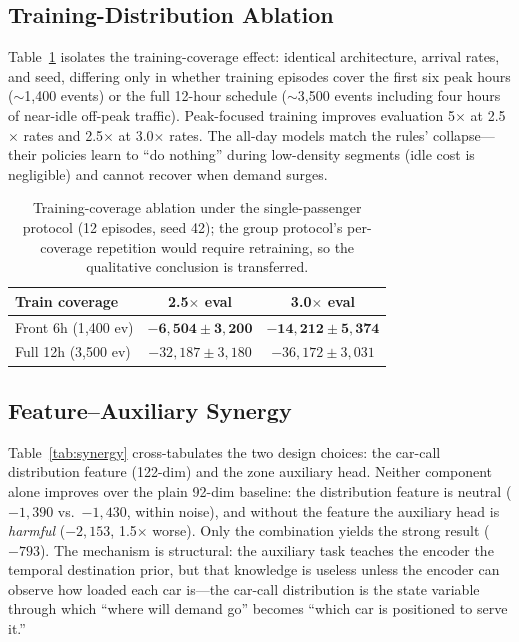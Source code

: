 \documentclass[conference]{IEEEtran}
\begin{document}
\subsection{Training-Distribution Ablation}

Table~\ref{tab:coverage} isolates the training-coverage effect:
identical architecture, arrival rates, and seed, differing only in
whether training episodes cover the first six peak hours
($\sim$1{,}400 events) or the full 12-hour schedule
($\sim$3{,}500 events including four hours of near-idle off-peak
traffic). Peak-focused training improves evaluation 5$\times$ at
2.5$\times$ rates and 2.5$\times$ at 3.0$\times$ rates. The
all-day models match the rules' collapse---their policies learn to
``do nothing'' during low-density segments (idle cost is negligible)
and cannot recover when demand surges.

\begin{table}[t]
\centering
\caption{Training-coverage ablation under the single-passenger protocol (12 episodes, seed 42); the group protocol's per-coverage repetition would require retraining, so the qualitative conclusion is transferred.}
\label{tab:coverage}
\begin{tabular}{@{}lcc@{}}
\toprule
Train coverage & 2.5$\times$ eval & 3.0$\times$ eval \\
\midrule
Front 6h (1{,}400 ev) & $\mathbf{-6{,}504 \pm 3{,}200}$ &
$\mathbf{-14{,}212 \pm 5{,}374}$ \\
Full 12h (3{,}500 ev) & $-32{,}187 \pm 3{,}180$ & $-36{,}172 \pm 3{,}031$ \\
\bottomrule
\end{tabular}
\end{table}

\subsection{Feature--Auxiliary Synergy}

Table~\ref{tab:synergy} cross-tabulates the two design choices: the
car-call distribution feature (122-dim) and the zone auxiliary head.
Neither component alone improves over the plain 92-dim baseline:
the distribution feature is neutral
($-1{,}390$ vs.~$-1{,}430$, within noise), and without the feature
the auxiliary head is \emph{harmful} ($-2{,}153$, 1.5$\times$
worse). Only the combination yields the strong result
($-793$). The mechanism is structural: the auxiliary task
teaches the encoder the temporal destination prior, but that
knowledge is useless unless the encoder can observe how loaded each
car is---the car-call distribution is the state variable through
which ``where will demand go'' becomes ``which car is positioned to
serve it.''
\end{document}
